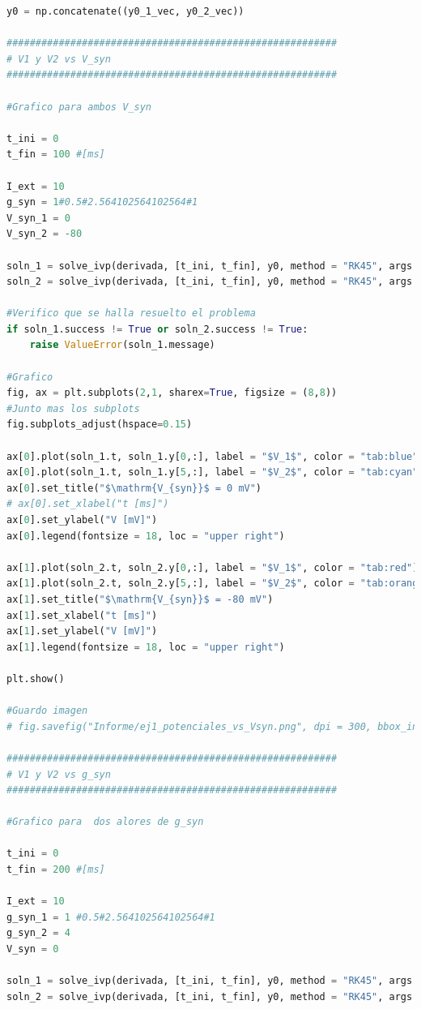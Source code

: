 \documentclass[aps,prb,twocolumn,superscriptaddress,floatfix,longbibliography]{revtex4-2}
\newcounter{para}
\begin{document}
\begin{lstlisting}[language=Python]
y0 = np.concatenate((y0_1_vec, y0_2_vec))

#########################################################
# V1 y V2 vs V_syn
#########################################################

#Grafico para ambos V_syn

t_ini = 0
t_fin = 100 #[ms]

I_ext = 10
g_syn = 1#0.5#2.564102564102564#1
V_syn_1 = 0
V_syn_2 = -80

soln_1 = solve_ivp(derivada, [t_ini, t_fin], y0, method = "RK45", args = (I_ext,g_syn,V_syn_1), dense_output = True)
soln_2 = solve_ivp(derivada, [t_ini, t_fin], y0, method = "RK45", args = (I_ext,g_syn,V_syn_2), dense_output = True)

#Verifico que se halla resuelto el problema
if soln_1.success != True or soln_2.success != True:
    raise ValueError(soln_1.message)

#Grafico
fig, ax = plt.subplots(2,1, sharex=True, figsize = (8,8))
#Junto mas los subplots
fig.subplots_adjust(hspace=0.15)

ax[0].plot(soln_1.t, soln_1.y[0,:], label = "$V_1$", color = "tab:blue")
ax[0].plot(soln_1.t, soln_1.y[5,:], label = "$V_2$", color = "tab:cyan")
ax[0].set_title("$\mathrm{V_{syn}}$ = 0 mV")
# ax[0].set_xlabel("t [ms]")
ax[0].set_ylabel("V [mV]")
ax[0].legend(fontsize = 18, loc = "upper right")

ax[1].plot(soln_2.t, soln_2.y[0,:], label = "$V_1$", color = "tab:red")
ax[1].plot(soln_2.t, soln_2.y[5,:], label = "$V_2$", color = "tab:orange")
ax[1].set_title("$\mathrm{V_{syn}}$ = -80 mV")
ax[1].set_xlabel("t [ms]")
ax[1].set_ylabel("V [mV]")
ax[1].legend(fontsize = 18, loc = "upper right")

plt.show()

#Guardo imagen
# fig.savefig("Informe/ej1_potenciales_vs_Vsyn.png", dpi = 300, bbox_inches = "tight")

#########################################################
# V1 y V2 vs g_syn
#########################################################

#Grafico para  dos alores de g_syn

t_ini = 0
t_fin = 200 #[ms]

I_ext = 10
g_syn_1 = 1 #0.5#2.564102564102564#1
g_syn_2 = 4
V_syn = 0

soln_1 = solve_ivp(derivada, [t_ini, t_fin], y0, method = "RK45", args = (I_ext,g_syn_1,V_syn), dense_output = True)
soln_2 = solve_ivp(derivada, [t_ini, t_fin], y0, method = "RK45", args = (I_ext,g_syn_2,V_syn), dense_output = True)


\end{lstlisting}
\end{document}

